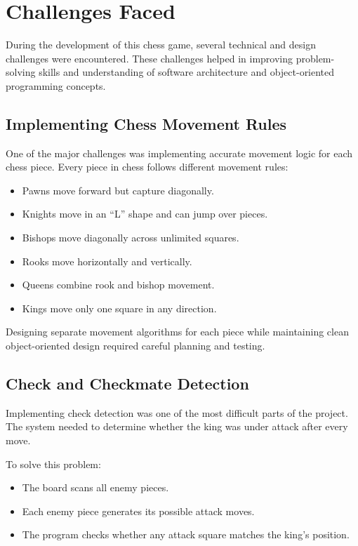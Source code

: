 \documentclass[11pt]{article}
\begin{document}

\section{Challenges Faced}

During the development of this chess game, several technical and design challenges were encountered. These challenges helped in improving problem-solving skills and understanding of software architecture and object-oriented programming concepts.

\subsection{Implementing Chess Movement Rules}

One of the major challenges was implementing accurate movement logic for each chess piece. Every piece in chess follows different movement rules:

\begin{itemize}
    \item Pawns move forward but capture diagonally.
    \item Knights move in an ``L'' shape and can jump over pieces.
    \item Bishops move diagonally across unlimited squares.
    \item Rooks move horizontally and vertically.
    \item Queens combine rook and bishop movement.
    \item Kings move only one square in any direction.
\end{itemize}

Designing separate movement algorithms for each piece while maintaining clean object-oriented design required careful planning and testing.

\subsection{Check and Checkmate Detection}

Implementing check detection was one of the most difficult parts of the project. The system needed to determine whether the king was under attack after every move.

To solve this problem:

\begin{itemize}
    \item The board scans all enemy pieces.
    \item Each enemy piece generates its possible attack moves.
    \item The program checks whether any attack square matches the king's position.
\end{itemize}
\end{document}
